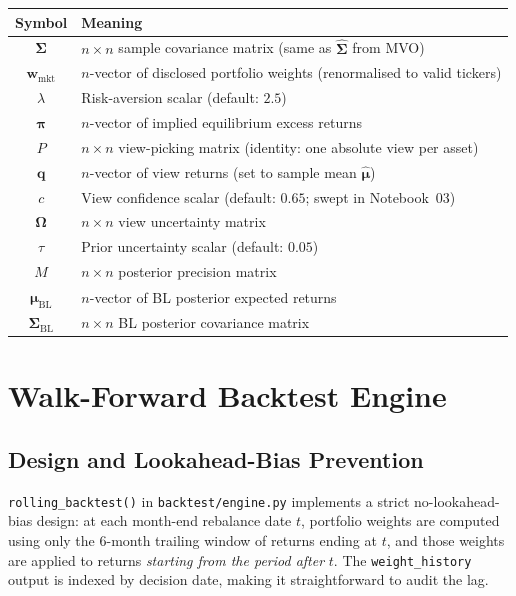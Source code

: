 \documentclass[11pt, a4paper]{article}
\newcommand{\BL}{\mathrm{BL}}
\newcommand{\code}[1]{\texttt{#1}}
\begin{document}
\medskip
\begin{center}
\begin{tabular}{@{}cl@{}}
  \toprule
  \textbf{Symbol} & \textbf{Meaning} \\
  \midrule
  $\bm{\Sigma}$            & $n \times n$ sample covariance matrix (same as $\hat{\bm{\Sigma}}$ from MVO) \\
  $\bm{w}_{\text{mkt}}$    & $n$-vector of disclosed portfolio weights (renormalised to valid tickers) \\
  $\lambda$                & Risk-aversion scalar (default: $2.5$) \\
  $\bm{\pi}$               & $n$-vector of implied equilibrium excess returns \\
  $P$                      & $n \times n$ view-picking matrix (identity: one absolute view per asset) \\
  $\bm{q}$                 & $n$-vector of view returns (set to sample mean $\hat{\bm{\mu}}$) \\
  $c$                      & View confidence scalar (default: $0.65$; swept in Notebook~03) \\
  $\bm{\Omega}$            & $n \times n$ view uncertainty matrix \\
  $\tau$                   & Prior uncertainty scalar (default: $0.05$) \\
  $M$                      & $n \times n$ posterior precision matrix \\
  $\bm{\mu}_{\BL}$         & $n$-vector of BL posterior expected returns \\
  $\bm{\Sigma}_{\BL}$      & $n \times n$ BL posterior covariance matrix \\
  \bottomrule
\end{tabular}
\end{center}

\section{Walk-Forward Backtest Engine}

\subsection{Design and Lookahead-Bias Prevention}

\code{rolling\_backtest()} in \code{backtest/engine.py} implements a strict
no-lookahead-bias design: at each month-end rebalance date $t$, portfolio
weights are computed using only the 6-month trailing window of returns ending
at $t$, and those weights are applied to returns \emph{starting from the
period after} $t$. The \code{weight\_history} output is indexed by decision
date, making it straightforward to audit the lag.
\end{document}
